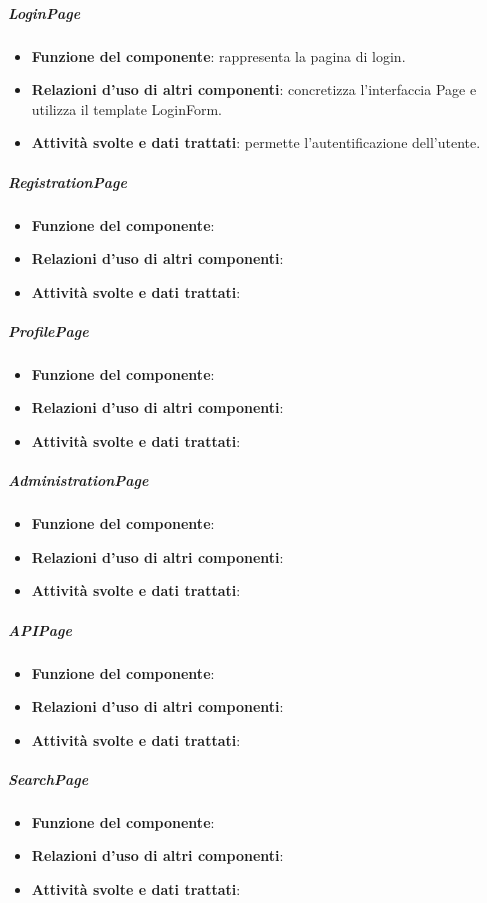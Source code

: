 \subparagraph{LoginPage}
\begin{itemize}
	\item \textbf{Funzione del componente}: rappresenta la pagina di login.
	\item \textbf{Relazioni d’uso di altri componenti}: concretizza l'interfaccia Page e utilizza il template LoginForm.
	\item \textbf{Attività svolte e dati trattati}: permette l'autentificazione dell'utente.	
\end{itemize}

\subparagraph{RegistrationPage}
\begin{itemize}
	\item \textbf{Funzione del componente}: 
	\item \textbf{Relazioni d’uso di altri componenti}: 
	\item \textbf{Attività svolte e dati trattati}: 	
\end{itemize}

\subparagraph{ProfilePage}
\begin{itemize}
	\item \textbf{Funzione del componente}: 
	\item \textbf{Relazioni d’uso di altri componenti}: 
	\item \textbf{Attività svolte e dati trattati}: 	
\end{itemize}

\subparagraph{AdministrationPage}
\begin{itemize}
	\item \textbf{Funzione del componente}: 
	\item \textbf{Relazioni d’uso di altri componenti}: 
	\item \textbf{Attività svolte e dati trattati}: 	
\end{itemize}

\subparagraph{APIPage}
\begin{itemize}
	\item \textbf{Funzione del componente}: 
	\item \textbf{Relazioni d’uso di altri componenti}: 
	\item \textbf{Attività svolte e dati trattati}: 	
\end{itemize}

\subparagraph{SearchPage}
\begin{itemize}
	\item \textbf{Funzione del componente}: 
	\item \textbf{Relazioni d’uso di altri componenti}: 
	\item \textbf{Attività svolte e dati trattati}: 	
\end{itemize}

